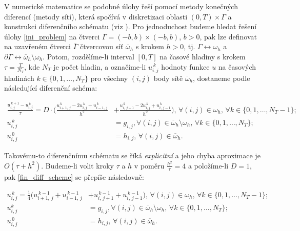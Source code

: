 \documentclass[11pt,american,czech]{article}
\newcommand*\midpoint[1]{\overline{#1}}
\begin{document}
V numerické matematice se podobné úlohy řeší pomocí metody konečných diferencí (metody sítí), která spočívá v diskretizaci oblasti $(0,T)\times\Gamma$ a konstrukci diferenčního schématu (viz \cite{BENES2017}). Pro jednoduchost budeme hledat řešení úlohy \eqref{ini_problem} na čtverci $\Gamma=(-b,b)\times(-b,b)$, $b>0$, pak lze definovat na uzavřeném čtverci $\midpoint{\Gamma}$ čtvercovou síť $\midpoint{\omega}_{h}$ s krokem $h>0$, tj. $\Gamma\leftrightarrow\omega_{h}$ a $\partial\Gamma\leftrightarrow\midpoint{\omega}_{h}\setminus\omega_{h}$. Potom, rozdělíme-li interval $[0,T]$ na časové hladiny s krokem $\tau=\tfrac{T}{N_{T}}$, kde $N_{T}$ je počet hladin, a označíme-li $u^{\,k}_{i,j}$ hodnoty funkce $u$ na časových hladinách $k\in\{0,1,\dots,N_{T}\}$ pro všechny $(i,j)$ body sítě $\midpoint{\omega}_{h}$, dostaneme podle \cite{BENES2017} následující diferenční schéma:

\begin{equation} \label{fin_diff_scheme}
	\begin{split}
		\frac{u^{\,k+1}_{i,j}-u^{\,k}_{i,j}}{\tau}=D\cdot\big(\frac{u^{\,k}_{i+1,\,j}-2u^{\,k}_{i,j}+u^{\,k}_{i-1,\,j}}{h^{2}}&+\frac{u^{\,k}_{i,\,j+1}-2u^{\,k}_{i,j}+u^{\,k}_{i,\,j-1}}{h^{2}}\big),\,\forall(i,j)\in\omega_{h},\,\forall k\in\{0,1,\dots,N_{T}-1\};\\	
		u^{\,k}_{i,j}&=g_{i,j},\forall(i,j)\in\midpoint{\omega}_{h}\setminus\omega_{h},\,\forall k\in\{0,1,\dots,N_{T}\};\\
		u^{\,0}_{i,j}&=h_{i,j},\,\forall(i,j)\in\midpoint{\omega}_{h}.
	\end{split}
\end{equation}

Takovému-to diferenčnímu schématu se říká \textit{explicitní} a jeho chyba aproximace je $O(\tau+h^{2})$. Budeme-li volit kroky $\tau$ a $h$ v poměru $\frac{h^{2}}{\tau}=4$ a položíme-li $D=1$, pak \eqref{fin_diff_scheme} se přepíše následovně:

\begin{equation}\label{final_fin_diff_scheme}
	\begin{split}
		u^{\,k}_{i,j}=\frac{1}{4}\big(u^{\,k-1}_{i+1,\,j}+u^{\,k-1}_{i-1,\,j}&+u^{\,k-1}_{i,\,j+1}+u^{\,k-1}_{i,\,j-1}\big),\,\forall(i,j)\in\omega_{h},\,\forall k\in\{0,1,\dots,N_{T}-1\};\\
		u^{k}_{i,j}&=g_{i,j},\forall(i,j)\in\midpoint{\omega}_{h}\setminus\omega_{h},\,\forall k\in\{0,1,\dots,N_{T}\};\\
		u^{\,0}_{i,j}&=h_{i,j},\,\forall(i,j)\in\midpoint{\omega}_{h}.
	\end{split}
\end{equation}
\end{document}
